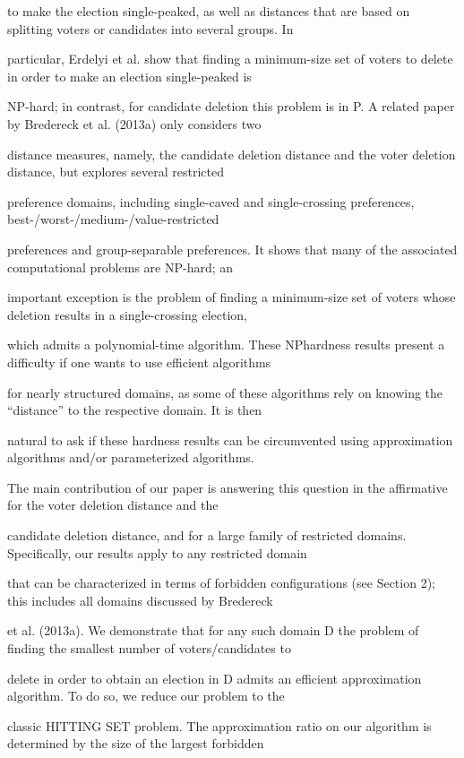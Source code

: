\documentclass[12pt, a4paper]{report}
\begin{document}
to make the election single-peaked, as well as distances that are based on splitting voters or candidates into several groups. In 

particular, Erdelyi et al. show that finding a minimum-size set of voters to delete in order to make an election single-peaked is 

NP-hard; in contrast, for candidate deletion this problem is in P. A related paper by Bredereck et al. (2013a) only considers two 

distance measures, namely, the candidate deletion distance and the voter deletion distance, but explores several restricted 

preference domains, including single-caved and single-crossing preferences, best-/worst-/medium-/value-restricted 

preferences and group-separable preferences. It shows that many of the associated computational problems are NP-hard; an 

important exception is the problem of finding a minimum-size set of voters whose deletion results in a single-crossing election, 

which admits a polynomial-time algorithm. These NPhardness results present a difficulty if one wants to use efficient algorithms 

for nearly structured domains, as some of these algorithms rely on knowing the “distance” to the respective domain. It is then 

natural to ask if these hardness results can be circumvented using approximation algorithms and/or parameterized algorithms. 

The main contribution of our paper is answering this question in the affirmative for the voter deletion distance and the 

candidate deletion distance, and for a large family of restricted domains. Specifically, our results apply to any restricted domain 

that can be characterized in terms of forbidden configurations (see Section 2); this includes all domains discussed by Bredereck 

et al. (2013a). We demonstrate that for any such domain D the problem of finding the smallest number of voters/candidates to 

delete in order to obtain an election in D admits an efficient approximation algorithm. To do so, we reduce our problem to the 

classic HITTING SET problem. The approximation ratio on our algorithm is determined by the size of the largest forbidden 
\end{document}

